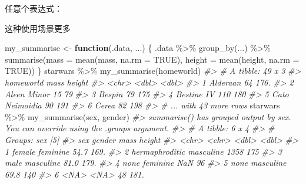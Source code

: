 \documentclass[
]{book}
\newenvironment{Shaded}{\begin{snugshade}}{\end{snugshade}}
\newcommand{\AttributeTok}[1]{\textcolor[rgb]{0.77,0.63,0.00}{#1}}
\newcommand{\CommentTok}[1]{\textcolor[rgb]{0.56,0.35,0.01}{\textit{#1}}}
\newcommand{\ConstantTok}[1]{\textcolor[rgb]{0.00,0.00,0.00}{#1}}
\newcommand{\ControlFlowTok}[1]{\textcolor[rgb]{0.13,0.29,0.53}{\textbf{#1}}}
\newcommand{\FunctionTok}[1]{\textcolor[rgb]{0.00,0.00,0.00}{#1}}
\newcommand{\NormalTok}[1]{#1}
\newcommand{\OtherTok}[1]{\textcolor[rgb]{0.56,0.35,0.01}{#1}}
\newcommand{\SpecialCharTok}[1]{\textcolor[rgb]{0.00,0.00,0.00}{#1}}
\begin{document}
任意个表达式：

这种使用场景更多

\begin{Shaded}
\begin{Highlighting}[]
\NormalTok{my\_summarise }\OtherTok{\textless{}{-}} \ControlFlowTok{function}\NormalTok{(.data, ...) \{}
\NormalTok{  .data }\SpecialCharTok{\%\textgreater{}\%}
    \FunctionTok{group\_by}\NormalTok{(...) }\SpecialCharTok{\%\textgreater{}\%}
    \FunctionTok{summarise}\NormalTok{(}\AttributeTok{mass =} \FunctionTok{mean}\NormalTok{(mass, }\AttributeTok{na.rm =} \ConstantTok{TRUE}\NormalTok{), }\AttributeTok{height =} \FunctionTok{mean}\NormalTok{(height, }\AttributeTok{na.rm =} \ConstantTok{TRUE}\NormalTok{))}
\NormalTok{\}}
\NormalTok{starwars }\SpecialCharTok{\%\textgreater{}\%} \FunctionTok{my\_summarise}\NormalTok{(homeworld)}
\CommentTok{\#\textgreater{} \# A tibble: 49 x 3}
\CommentTok{\#\textgreater{}   homeworld       mass height}
\CommentTok{\#\textgreater{}   \textless{}chr\textgreater{}          \textless{}dbl\textgreater{}  \textless{}dbl\textgreater{}}
\CommentTok{\#\textgreater{} 1 Alderaan          64   176.}
\CommentTok{\#\textgreater{} 2 Aleen Minor       15    79 }
\CommentTok{\#\textgreater{} 3 Bespin            79   175 }
\CommentTok{\#\textgreater{} 4 Bestine IV       110   180 }
\CommentTok{\#\textgreater{} 5 Cato Neimoidia    90   191 }
\CommentTok{\#\textgreater{} 6 Cerea             82   198 }
\CommentTok{\#\textgreater{} \# ... with 43 more rows}
\NormalTok{starwars }\SpecialCharTok{\%\textgreater{}\%} \FunctionTok{my\_summarise}\NormalTok{(sex, gender)}
\CommentTok{\#\textgreater{} \textasciigrave{}summarise()\textasciigrave{} has grouped output by \textquotesingle{}sex\textquotesingle{}. You can override using the \textasciigrave{}.groups\textasciigrave{} argument.}
\CommentTok{\#\textgreater{} \# A tibble: 6 x 4}
\CommentTok{\#\textgreater{} \# Groups:   sex [5]}
\CommentTok{\#\textgreater{}   sex            gender      mass height}
\CommentTok{\#\textgreater{}   \textless{}chr\textgreater{}          \textless{}chr\textgreater{}      \textless{}dbl\textgreater{}  \textless{}dbl\textgreater{}}
\CommentTok{\#\textgreater{} 1 female         feminine    54.7   169.}
\CommentTok{\#\textgreater{} 2 hermaphroditic masculine 1358     175 }
\CommentTok{\#\textgreater{} 3 male           masculine   81.0   179.}
\CommentTok{\#\textgreater{} 4 none           feminine   NaN      96 }
\CommentTok{\#\textgreater{} 5 none           masculine   69.8   140 }
\CommentTok{\#\textgreater{} 6 \textless{}NA\textgreater{}           \textless{}NA\textgreater{}        48     181.}
\end{Highlighting}
\end{Shaded}
\end{document}
